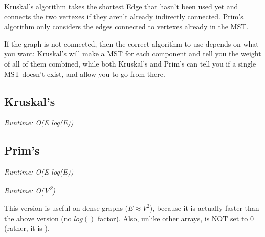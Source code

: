 
Kruskal's algorithm takes the shortest Edge that hasn't been used yet and connects the two vertexes if they aren't already indirectly connected. Prim's algorithm only considers the edges connected to vertexes already in the MST.

If the graph is not connected, then the correct algorithm to use depends on what you want: Kruskal's will make a MST for each component and tell you the weight of all of them combined, while both Kruskal's and Prim's can tell you if a single MST doesn't exist, and allow you to go from there.

\subsection*{Kruskal's}

\textit{Runtime: O(E log(E))}



\subsection*{Prim's}

\textit{Runtime: O(E log(E))}



\textit{Runtime: O(V\textsuperscript{2})}

This version is useful on dense graphs ($E \approx V^2$), because it is actually faster than the above version (no $log()$ factor). Also, unlike other  arrays,  is NOT set to 0 (rather, it is ).



\newpage